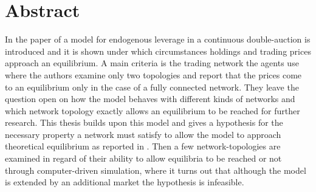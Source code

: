 \documentclass[Bachelorarbeit.tex]{subfiles}
\begin{document}
\chapter*{Abstract}
In the paper of \cite{Breuer2015} a model for endogenous leverage in a continuous double-auction is introduced and it is shown under which circumstances holdings and trading prices approach an equilibrium. A main criteria is the trading network the agents use where the authors examine only two topologies and report that the prices come to an equilibrium only in the case of a fully connected network. They leave the question open on how the model behaves with different kinds of networks and which network topology exactly allows an equilibrium to be reached  for further research. This thesis builds upon this model and gives a hypothesis for the necessary property a network must satisfy to allow the model to approach theoretical equilibrium as reported in \cite{Breuer2015}. Then a few network-topologies are examined in regard of their ability to allow equilibria to be reached or not through computer-driven simulation, where it turns out that although the model is extended by an additional market the hypothesis is infeasible.
\end{document}
